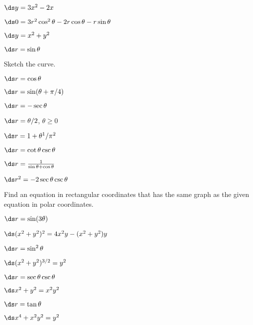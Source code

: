 \begin{exercises}
\exercise $\ds y=3x^2-2x$
\begin{answer} $\ds 0=3r^2\cos^2\theta-2r\cos\theta-r\sin\theta$
\end{answer}

\exercise $\ds y=x^2+y^2$
\begin{answer} $\ds r=\sin\theta$
\end{answer}

\endtwocol
\bsk
\noindent Sketch the curve.
\twocol

\exercise $\ds r=\cos\theta$

\exercise $\ds r=\sin(\theta+\pi/4)$

\exercise $\ds r=-\sec\theta$

\exercise $\ds r=\theta/2$, $\theta\ge0$

\exercise $\ds r=1+\theta^1/\pi^2$

\exercise $\ds r=\cot\theta\csc\theta$

\exercise $\ds r={1\over\sin\theta+\cos\theta}$

\exercise $\ds r^2=-2\sec\theta\csc\theta$

\endtwocol

\bigbreak
\noindent Find an equation in rectangular coordinates that has the same
graph as the given equation in polar coordinates.

\twocol

\exercise $\ds r=\sin(3\theta)$
\begin{answer} $\ds (x^2+y^2)^2=4x^2y-(x^2+y^2)y$
\end{answer}

\exercise $\ds r=\sin^2\theta$
\begin{answer} $\ds (x^2+y^2)^{3/2}=y^2$
\end{answer}

\exercise $\ds r=\sec\theta\csc\theta$
\begin{answer} $\ds x^2+y^2=x^2y^2$
\end{answer}

\exercise $\ds r=\tan\theta$
\begin{answer} $\ds x^4+x^2y^2=y^2$
\end{answer}

\endtwocol

\end{exercises}
